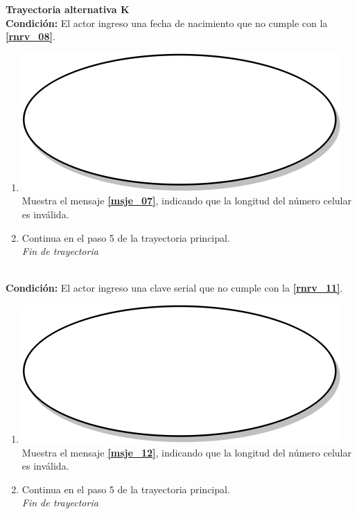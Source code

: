 \textbf{Trayectoria alternativa K} \label{cu2_ta_k}\\
\textbf{Condición:} El actor ingreso una fecha de nacimiento que no cumple con la \textbf{\ref{rnrv_08}}.\\
 \begin{enumerate}[label=K\arabic*]
    \item {\includegraphics[scale=.05]{Capitulo3/img/proceso.png} Muestra el mensaje \textbf{\ref{msje_07}}, indicando que la longitud del número celular es inválida.}
    \item {Continua en el paso 5 de la trayectoria principal.} \\
    \textit{Fin de trayectoria} \\
\end{enumerate}

\textbf{}\\
\textbf{Condición:} El actor ingreso una clave serial que no cumple con la \textbf{\ref{rnrv_11}}.\\
 \begin{enumerate}[label=L\arabic*]
    \item {\includegraphics[scale=.05]{Capitulo3/img/proceso.png} Muestra el mensaje \textbf{\ref{msje_12}}, indicando que la longitud del número celular es inválida.}
    \item {Continua en el paso 5 de la trayectoria principal.} \\
    \textit{Fin de trayectoria} \\
\end{enumerate}

